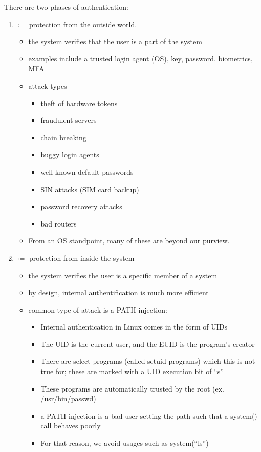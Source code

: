 \documentclass[../../lecture_notes.tex]{subfiles}
\begin{document}
There are two phases of authentication:
\begin{enumerate}
\item {} $\coloneqq$ protection from the outside world.
\begin{itemize}
	\item the system verifies that the user is a part of the system
	\item examples include a trusted login agent (OS), key, password, biometrics, MFA
	\item attack types
		\begin{itemize}
			\item theft of hardware tokens
			\item fraudulent servers
			\item chain breaking
			\item buggy login agents
			\item well known default passwords
			\item SIN attacks (SIM card backup)
			\item password recovery attacks
			\item bad routers
		\end{itemize}
	\item From an OS standpoint, many of these are beyond our purview.
\end{itemize}

\item {} $\coloneqq$ protection from inside the system
\begin{itemize}
	\item the system verifies the user is a specific member of a system
	\item by design, internal authentification is much more efficient
	\item common type of attack is a PATH injection:
		\begin{itemize}
			\item Internal authentication in Linux comes in the form of UIDs
			\item The UID is the current user, and the EUID is the program’s creator
			\item There are select programs (called setuid programs) which this is not true for; these are marked with a UID execution bit of “s”
			\item These programs are automatically trusted by the root (ex. /usr/bin/passwd)
			\item a PATH injection is a bad user setting the path such that a system() call behaves poorly
			\item For that reason, we avoid usages such as system(“ls”)
		\end{itemize}
\end{itemize}
\end{enumerate}
\end{document}
